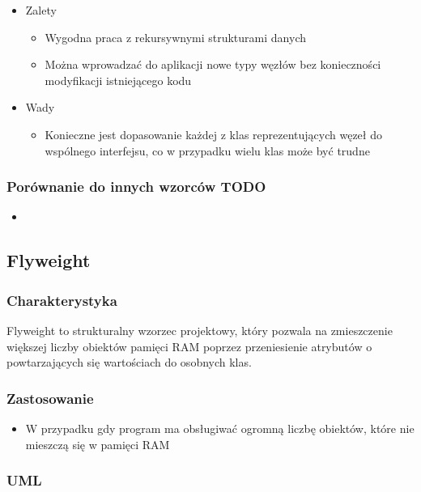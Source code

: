 \documentclass[a4paper,15pt]{article}
\begin{document}
\begin{itemize}
\item Zalety
\begin{itemize}
\item Wygodna praca z rekursywnymi strukturami danych
\item Można wprowadzać do aplikacji nowe typy węzłów bez konieczności modyfikacji istniejącego kodu
\end{itemize}
\item Wady
\begin{itemize}
\item Konieczne jest dopasowanie każdej z klas reprezentujących węzeł do wspólnego interfejsu, co w przypadku wielu klas może być trudne
\end{itemize}
\end{itemize}


\subsubsection{Porównanie do innych wzorców TODO}
\begin{itemize}
\item
\end{itemize}

\newpage
\subsection{Flyweight}

\subsubsection{Charakterystyka}
Flyweight to strukturalny wzorzec projektowy, który pozwala na zmieszczenie większej liczby obiektów pamięci RAM poprzez przeniesienie atrybutów o powtarzających się wartościach do osobnych klas.

\subsubsection{Zastosowanie}
\begin{itemize}
\item W przypadku gdy program ma obsługiwać ogromną liczbę obiektów, które nie mieszczą się w pamięci RAM
\end{itemize}

\subsubsection{UML}
\end{document}
